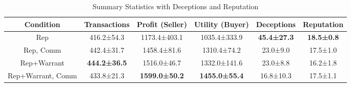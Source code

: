\begin{table}[t]
    \centering
    \caption{Summary Statistics with Deceptions and Reputation}
    \label{tab:rq3_summary_stats}
    \begin{tabular}{cccccc}
    \toprule
    \textbf{Condition} & \textbf{Transactions} & \textbf{Profit (Seller)} & \textbf{Utility (Buyer)} & \textbf{Deceptions} & \textbf{Reputation} \\
    \midrule
    Rep & 416.2±54.3 & 1173.4±403.1 & 1035.4±333.9 & \textbf{45.4±27.3} & \textbf{18.5±0.8} \\
    Rep, Comm & 442.4±31.7 & 1458.4±81.6 & 1310.4±74.2 & 23.0±9.0 & 17.5±1.0 \\
    Rep+Warrant & \textbf{444.2±36.5} & 1516.0±46.7 & 1332.0±141.6 & 23.0±8.8 & 16.2±1.8 \\
    Rep+Warrant, Comm & 433.8±21.3 & \textbf{1599.0±50.2} & \textbf{1455.0±55.4} & 16.8±10.3 & 17.5±1.1 \\
    \bottomrule
    \end{tabular}
\end{table}